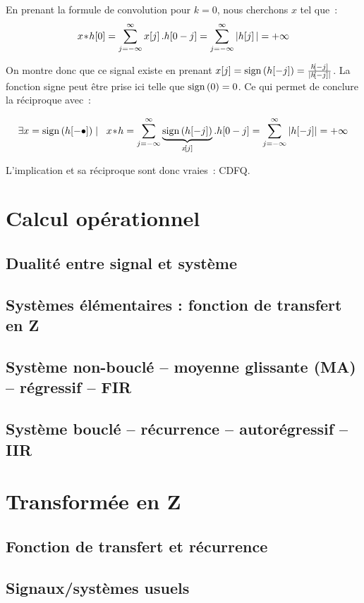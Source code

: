 \begin{demo}
\begin{description}
    En prenant la formule de convolution pour $k=0$, nous cherchons
    $x$ tel que~:
  $$ x\!\ast\! h\!\left[0\right]= \sum\limits_{j=-\infty}^{\infty}{x\!\left[j\right].h\!\left[0-j\right]} =  \sum\limits_{j=-\infty}^{\infty}{|h\!\left[j\right]|} = +\infty$$

  On montre donc que ce signal existe en prenant
  $x[j]=\mathop{\mathrm{sign}}\left(h\!\left[-j\right]\right)=\frac{h\!\left[-j\right]}{\left|h\!\left[-j\right]\right|}$. La
  fonction signe peut être prise ici telle que $\mathop{\mathrm{sign}}\left(0\right)=0$.  Ce qui
  permet de conclure la réciproque avec~:

  $$\exists x=\mathop{\mathrm{sign}}\left(h\!\left[-\bullet\right]\right) \mathrel{}\mid\mathrel{} \;\; x\!\ast\! h = \sum\limits_{j=-\infty}^{\infty}{\underbrace{\mathop{\mathrm{sign}}\left(h\!\left[-j\right]\right)}_{x\!\left[j\right]}.h\!\left[0-j\right]}= \sum\limits_{j=-\infty}^{\infty}{\left|h\!\left[-j\right]\right|}=+\infty$$

  L'implication et sa réciproque sont donc vraies~: CDFQ.
  
\end{description}
\end{demo}
\section{Calcul opérationnel}
\subsection{Dualité entre signal et système}
\subsection{Systèmes élémentaires : fonction de transfert en Z}
\subsection{Système non-bouclé -- moyenne glissante (MA) -- régressif --
  FIR}
\subsection{Système bouclé -- récurrence -- autorégressif -- IIR}

\section{Transformée en Z}

\subsection{Fonction de transfert et récurrence}
\subsection{Signaux/systèmes usuels}
